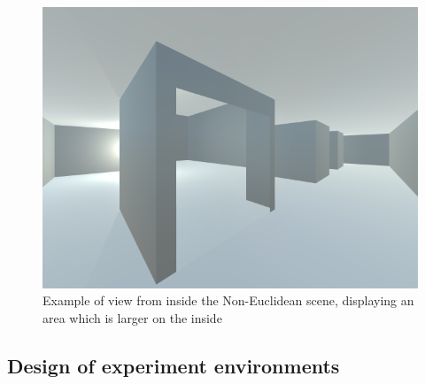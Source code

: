 	\begin{figure}[h]
		\label{design:fig:game}
		\includegraphics[width=1\textwidth]{Images/NE_View}
		\centering
		\caption{Example of view from inside the Non-Euclidean scene, displaying an area which is larger on the inside}
	\end{figure}

\begin{multicols*}{2}

	\section[Environment Design]{Design of experiment environments}


\end{multicols*}

